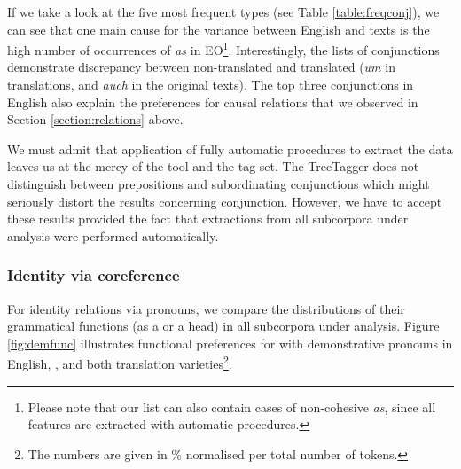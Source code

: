 \documentclass[output=paper]{langsci/langscibook.cls}
\begin{document}
If we take a look at the five most
frequent types (see Table \ref{table:freqconj}), we can see that one main cause for the variance between English and  texts is the high number of occurrences of  \textsl{as} in EO\footnote{Please note that our list can also contain cases of non-cohesive  \textsl{as}, since all features are extracted with automatic procedures.}. Interestingly, the  lists of conjunctions demonstrate discrepancy between non-translated and translated  (\textsl{um} in translations, and  \textsl{auch} in the original  texts). The top three conjunctions in English also explain the preferences for causal relations that we observed in Section \ref{section:relations} above. 

We must admit that application of fully automatic procedures to extract the data leaves us at the mercy of the tool and the tag set. The TreeTagger does not distinguish between prepositions and subordinating conjunctions which might seriously distort the results concerning conjunction. However, we have to accept these results provided the fact that extractions from all subcorpora under analysis were performed automatically. %

 
\subsubsection{Identity via coreference}\label{sec:identity}

For identity relations via pronouns, we compare the distributions of their grammatical functions (as a  or a head) in all subcorpora under analysis. Figure \ref{fig:demfunc} illustrates functional preferences for  with demonstrative pronouns in English, , and both translation varieties\footnote{The numbers are given in \% normalised per total number of tokens.}. 

%
\end{document}
